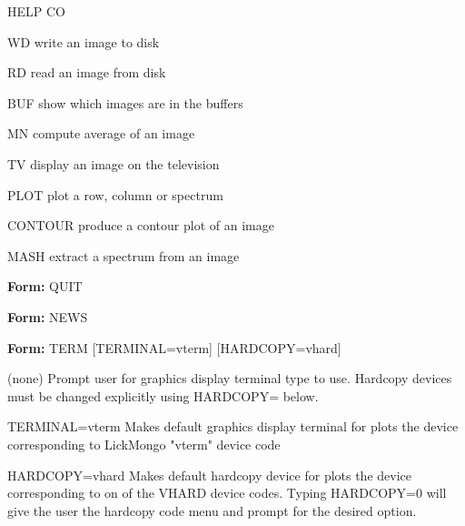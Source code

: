 {\newpage\clearpage
{}%
\begin{hanging}
   \item{HELP CO}
\end{hanging}%
\lthtmlfigureZ
\lthtmlcheckvsize\clearpage}

{\newpage\clearpage
{}%
\begin{example}
   \item[WD\hfill]{write an image to disk}
   \item[RD\hfill]{read an image from disk}
   \item[BUF\hfill]{show which images are in the buffers}
   \item[MN\hfill]{compute average of an image}
   \item[TV\hfill]{display an image on the television}
   \item[PLOT\hfill]{plot a row, column or spectrum}
   \item[CONTOUR\hfill]{produce a contour plot of an image}
   \item[MASH\hfill]{extract a spectrum from an image}
\end{example}%
\lthtmlfigureZ
\lthtmlcheckvsize\clearpage}

{\newpage\clearpage
{}%
\begin{command}
   \item[\textbf{Form: } QUIT\hfill]{}
\end{command}%
\lthtmlfigureZ
\lthtmlcheckvsize\clearpage}

{\newpage\clearpage
{}%
\begin{command}
  \item[\textbf{Form: } NEWS\hfill]{}
\end{command}%
\lthtmlfigureZ
\lthtmlcheckvsize\clearpage}

{\newpage\clearpage
{}%
\begin{command}
   \item[\textbf{Form: } TERM {[TERMINAL=vterm]} {[HARDCOPY=vhard]}\hfill]{}
\par
\item[(none)]{Prompt user for graphics display terminal type to use.
        Hardcopy devices must be changed explicitly using HARDCOPY= below.}
\par
\item[TERMINAL=vterm]{Makes default graphics display terminal for plots
        the device corresponding to LickMongo "vterm" device code}
\par
\item[HARDCOPY=vhard]{Makes default hardcopy device for plots the device
        corresponding to on of the VHARD device codes.  Typing HARDCOPY=0
        will give the user the hardcopy code menu and prompt for the
        desired option.}
\end{command}%
\lthtmlfigureZ
\lthtmlcheckvsize\clearpage}

